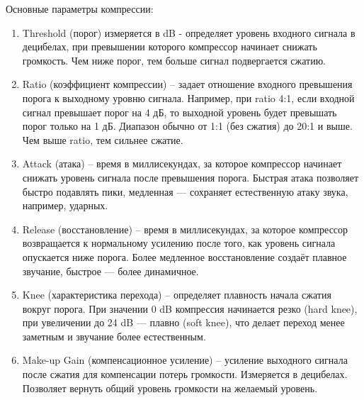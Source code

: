 Основные параметры компрессии:
\begin{enumerate}
	\item Threshold (порог) измеряется в dB - определяет уровень входного сигнала в децибелах, при превышении которого компрессор начинает снижать громкость. Чем ниже порог, тем больше сигнал подвергается сжатию.
	\item Ratio (коэффициент компрессии) – задает отношение входного превышения порога к выходному уровню сигнала. Например, при ratio 4:1, если входной сигнал превышает порог на 4 дБ, то выходной уровень будет превышать порог только на 1 дБ. Диапазон обычно от 1:1 (без сжатия) до 20:1 и выше. Чем выше ratio, тем сильнее сжатие.
	\item Attack (атака) – время в миллисекундах, за которое компрессор начинает снижать уровень сигнала после превышения порога. Быстрая атака позволяет быстро подавлять пики, медленная — сохраняет естественную атаку звука, например, ударных.
	\item Release (восстановление) – время в миллисекундах, за которое компрессор возвращается к нормальному усилению после того, как уровень сигнала опускается ниже порога. Более медленное восстановление создаёт плавное звучание, быстрое — более динамичное.
	\item Knee (характеристика перехода) – определяет плавность начала сжатия вокруг порога. При значении 0 dB компрессия начинается резко (hard knee), при увеличении до 24 dB — плавно (soft knee), что делает переход менее заметным и звучание более естественным.
	\item Make-up Gain (компенсационное усиление) – усиление выходного сигнала после сжатия для компенсации потерь громкости. Измеряется в децибелах. Позволяет вернуть общий уровень громкости на желаемый уровень.
\end{enumerate}

